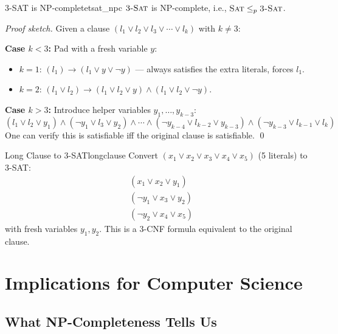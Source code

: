 \documentclass[12pt,a4paper]{article}
\newcommand{\SAT}{\textsc{Sat}}
\newcommand{\TSAT}{\textsc{3-Sat}}
\newcommand{\leqp}{\leq_p}
\begin{document}
\begin{theorem}{3-SAT is NP-complete}{tsat_npc}
$\TSAT$ is NP-complete, i.e., $\SAT \leqp \TSAT$.
\end{theorem}

\begin{proof}[Proof sketch]
Given a clause $(l_1 \lor l_2 \lor l_3 \lor \cdots \lor l_k)$ with $k \neq 3$:

\medskip
\noindent\textbf{Case $k < 3$:} Pad with a fresh variable $y$:
\begin{itemize}[leftmargin=2em]
  \item $k=1$: $(l_1) \to (l_1 \lor y \lor \neg y)$ --- always satisfies the extra literals, forces $l_1$.
  \item $k=2$: $(l_1 \lor l_2) \to (l_1 \lor l_2 \lor y) \land (l_1 \lor l_2 \lor \neg y)$.
\end{itemize}

\noindent\textbf{Case $k > 3$:} Introduce helper variables $y_1, \ldots, y_{k-3}$:
\[
  (l_1 \lor l_2 \lor y_1) \land (\neg y_1 \lor l_3 \lor y_2) \land \cdots 
  \land (\neg y_{k-4} \lor l_{k-2} \lor y_{k-3}) \land (\neg y_{k-3} \lor l_{k-1} \lor l_k)
\]
One can verify this is satisfiable iff the original clause is satisfiable. \qed
\end{proof}

\begin{example}{Long Clause to 3-SAT}{longclause}
Convert $(x_1 \lor x_2 \lor x_3 \lor x_4 \lor x_5)$ (5 literals) to 3-SAT:
\begin{align*}
  &(x_1 \lor x_2 \lor y_1) \\
  &(\neg y_1 \lor x_3 \lor y_2) \\
  &(\neg y_2 \lor x_4 \lor x_5)
\end{align*}
with fresh variables $y_1, y_2$. This is a 3-CNF formula equivalent to the original clause.
\end{example}

\newpage

\section{Implications for Computer Science}

\subsection{What NP-Completeness Tells Us}
\end{document}
